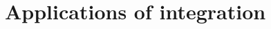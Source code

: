 \documentclass[../book/calcnotes.tex]{subfiles}
\begin{document}
\chapter{Applications of integration}
\label{ch:integral-applications}





\end{document}
